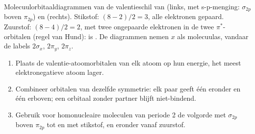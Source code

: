 \begin{omfigure}
\begin{MOdiagram}[names, labels, style=square, distance=4.2cm, labels-fs=\scriptsize]
\end{MOdiagram}
\hfill
\begin{MOdiagram}[names, labels, style=square, distance=4.2cm, labels-fs=\scriptsize]
\end{MOdiagram}

{\small Molecuulorbitaaldiagrammen van de valentieschil van  (links, met s-p-menging:
$\sigma_{2p}$ boven $\pi_{2p}$) en  (rechts). Stikstof: 
$(8 - 2)/2 = 3$, alle elektronen gepaard. Zuurstof:  $(8 - 4)/2 = 2$, met twee
ongepaarde elektronen in de twee $\pi^*$-orbitalen (regel van Hund):  is
. De diagrammen nemen $x$ als molecuulas, vandaar de labels
$2\sigma_x$, $2\pi_y$, $2\pi_z$.}
\end{omfigure}

\begin{method}\label{met:b2:diatomic-mos:build-diagram}
\begin{enumerate}
  \item Plaats de valentie-atoomorbitalen van elk atoom op hun energie, het meest
        elektronegatieve atoom lager.
  \item Combineer orbitalen van dezelfde symmetrie: elk paar geeft één 
        eronder en één  erboven; een orbitaal zonder partner blijft
        niet-bindend.
  \item Gebruik voor homonucleaire moleculen van periode 2 de volgorde met $\sigma_{2p}$ boven
        $\pi_{2p}$ tot en met stikstof, en eronder vanaf zuurstof.
\end{enumerate}
\end{method}

